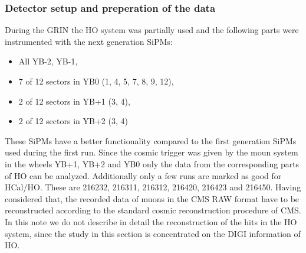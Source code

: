 		\subsubsection{Detector setup and preperation of the data}
			During the GRIN the HO system was partially used and the following parts were instrumented with the next generation SiPMs:
			\begin{itemize}
				\item All YB-2, YB-1,
				\item 7 of 12 sectors in YB0 (1, 4, 5, 7, 8, 9, 12),
				\item 2 of 12 sectors in YB+1 (3, 4),
				\item 2 of 12 sectors in YB+2 (3, 4)
			\end{itemize}
			These SiPMs have a better functionality compared to the first generation SiPMs used during the first run.
			Since the cosmic trigger was given by the moun system in the wheels YB+1, YB+2 and YB0 only the data from the corresponding parts of HO can be analyzed.
			Additionally only a few runs are marked as good for HCal/HO.
			These are 216232, 216311, 216312, 216420, 216423 and 216450.
			Having considered that, the recorded data of muons in the CMS RAW format have to be reconstructed according to the standard cosmic reconstruction procedure of CMS.
			In this note we do not describe in detail the reconstruction of the hits in the HO system, since the study in this section is concentrated on the DIGI information of HO.
